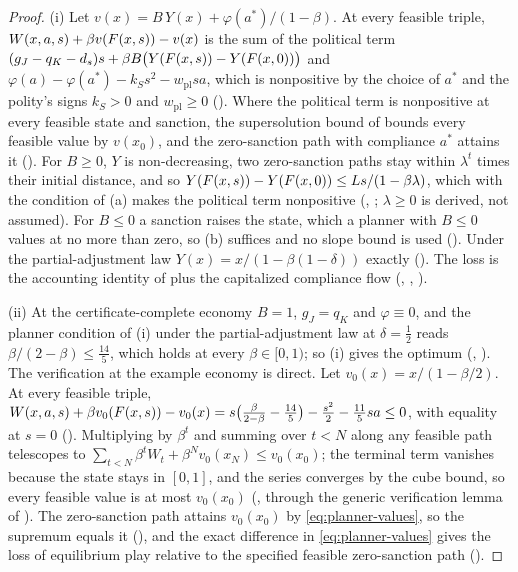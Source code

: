 \begin{proof}
(i) Let \(v(x)=B\,Y(x)+\varphi(a^\ast)/(1-\beta)\). At every feasible triple,
\(W(x,a,s)+\beta v(F(x,s))-v(x)\) is the sum of the political term
\((g_J-q_K-d_s)s+\beta B\bigl(Y(F(x,s))-Y(F(x,0))\bigr)\) and
\(\varphi(a)-\varphi(a^\ast)-k_Ss^2-w_{\mathrm{pl}}sa\), which is nonpositive by
the choice of \(a^\ast\) and the polity's signs $k_S>0$ and
$w_{\mathrm{pl}}\ge0$ (). Where the
political term is nonpositive at every feasible state and sanction, the
supersolution bound of  bounds every
feasible value by \(v(x_0)\), and the zero-sanction path with compliance
\(a^\ast\) attains it (). For
$B\ge0$, $Y$ is non-decreasing, two zero-sanction paths stay within
$\lambda^t$ times their initial distance, and so
$Y(F(x,s))-Y(F(x,0))\le Ls/(1-\beta\lambda)$, which with the condition of (a)
makes the political term nonpositive (,
; $\lambda\ge0$ is derived, not
assumed). For $B\le0$ a sanction raises the state, which a planner with
$B\le0$ values at no more than zero, so (b) suffices and no slope bound is used
(). Under the partial-adjustment law
$Y(x)=x/(1-\beta(1-\delta))$ exactly ().
The loss is the accounting identity of  plus the
capitalized compliance flow (,
,
).

(ii) At the certificate-complete economy $B=1$, $g_J=q_K$ and
\(\varphi\equiv0\), and the planner condition of (i) under the partial-adjustment law at \(\delta=\tfrac12\) reads
\(\beta/(2-\beta)\le\tfrac{14}{5}\), which holds at every \(\beta\in[0,1)\);
so (i) gives the optimum (,
). The verification at the example economy is
direct.
Let \(v_0(x)=x/(1-\beta/2)\). At every feasible triple,
\(W(x,a,s)+\beta v_0(F(x,s))-v_0(x)
=s\bigl(\tfrac{\beta}{2-\beta}-\tfrac{14}{5}\bigr)-\tfrac{s^2}{2}-\tfrac{11}{5}sa\le0\),
with equality at \(s=0\) (). Multiplying by
\(\beta^t\) and summing over \(t<N\) along any feasible path telescopes to
\(\sum_{t<N}\beta^tW_t+\beta^Nv_0(x_N)\le v_0(x_0)\); the terminal term
vanishes because the state stays in \([0,1]\), and the series converges by
the cube bound, so every feasible value is at most \(v_0(x_0)\)
(, through the generic verification lemma of
). The zero-sanction path
attains \(v_0(x_0)\) by \eqref{eq:planner-values}, so the supremum equals it
(), and the exact difference in
\eqref{eq:planner-values} gives the loss of equilibrium play relative to the
specified feasible zero-sanction path
().
\end{proof}

